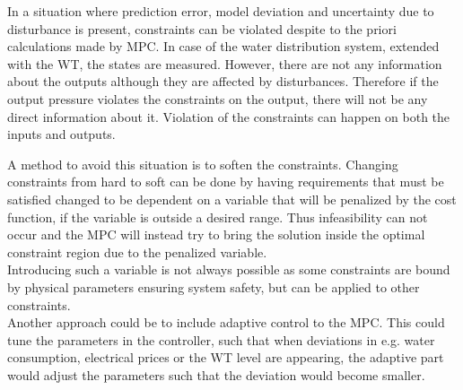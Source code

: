In a situation where prediction error, model deviation and uncertainty due to disturbance is present, constraints can be violated despite to the priori calculations made by MPC. In case of the water distribution system, extended with the WT, the states are measured. However, there are not any information about the outputs although they are affected by disturbances. Therefore if the output pressure violates the constraints on the output, there will not be any direct information about it. Violation of the constraints can happen on both the inputs and outputs.

A method to avoid this situation is to soften the constraints. Changing constraints from hard to soft can be done by having requirements that must be satisfied changed to be dependent on a variable that will be penalized by the cost function, if the variable is outside a desired range. Thus infeasibility can not occur and the MPC will instead try to bring the solution inside the optimal constraint region due to the penalized variable.\\   
Introducing such a variable is not always possible as some constraints are bound by physical parameters ensuring system safety, but can be applied to other constraints.\\

Another approach could be to include adaptive control to the MPC. This could tune the parameters in the controller, such that when deviations in e.g. water consumption, electrical prices or the WT level are appearing, the adaptive part would adjust the parameters such that the deviation would become smaller.






